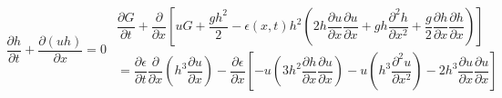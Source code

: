 \documentclass[10pt]{article}
\begin{document}
\begin{subequations}
	\begin{gather}
	\dfrac{\partial h}{\partial t} + \dfrac{\partial (uh)}{\partial x} = 0
	\end{gather}
	\begin{gather}
	\dfrac{\partial G}{\partial t} + \dfrac{\partial }{\partial x} \left[ uG + \dfrac{gh^2}{2} - \epsilon(x,t) h^2\left ( 2 h \dfrac{\partial u}{\partial x} \dfrac{\partial u}{\partial x} + gh \dfrac{\partial^2h}{\partial x^2} +\dfrac{g}{2} \dfrac{\partial h}{\partial x}\dfrac{\partial h}{\partial x} \right ) \right] \\= \dfrac{\partial \epsilon}{\partial t}\dfrac{\partial }{\partial x} \left (h^3 \dfrac{\partial u}{\partial x} \right ) -\dfrac{\partial\epsilon}{\partial x} \left[ - u\left (3h^2 \dfrac{\partial h}{\partial x} \dfrac{\partial u}{\partial x} \right ) - u \left(h^3 \dfrac{\partial^2 u}{\partial x^2} \right) -2 h^3 \dfrac{\partial u}{\partial x} \dfrac{\partial u}{\partial x} \right] 
	\end{gather}
	\label{eq:gSV_Gepsfunc}
\end{subequations}
\end{document}
